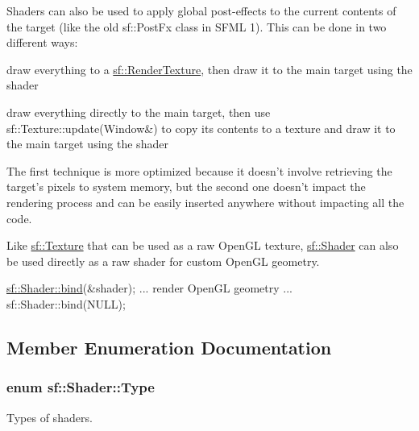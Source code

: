 Shaders can also be used to apply global post-\/effects to the current contents of the target (like the old sf\+::\+Post\+Fx class in S\+F\+M\+L 1). This can be done in two different ways\+: \begin{DoxyItemize}
\item draw everything to a \hyperlink{classsf_1_1_render_texture}{sf\+::\+Render\+Texture}, then draw it to the main target using the shader \item draw everything directly to the main target, then use sf\+::\+Texture\+::update(\+Window\&) to copy its contents to a texture and draw it to the main target using the shader\end{DoxyItemize}
The first technique is more optimized because it doesn't involve retrieving the target's pixels to system memory, but the second one doesn't impact the rendering process and can be easily inserted anywhere without impacting all the code.

Like \hyperlink{classsf_1_1_texture}{sf\+::\+Texture} that can be used as a raw Open\+G\+L texture, \hyperlink{classsf_1_1_shader}{sf\+::\+Shader} can also be used directly as a raw shader for custom Open\+G\+L geometry. 
\begin{DoxyCode}
\hyperlink{classsf_1_1_shader_a09778f78afcbeb854d608c8dacd8ea30}{sf::Shader::bind}(&shader);
... render OpenGL geometry ...
sf::Shader::bind(NULL);
\end{DoxyCode}
 

\subsection{Member Enumeration Documentation}
\hypertarget{classsf_1_1_shader_afaa1aa65e5de37b74d047da9def9f9b3}{
\subsubsection[{Type}]{\setlength{\rightskip}{0pt plus 5cm}enum {\bf sf\+::\+Shader\+::\+Type}}}\label{classsf_1_1_shader_afaa1aa65e5de37b74d047da9def9f9b3}


Types of shaders. 

